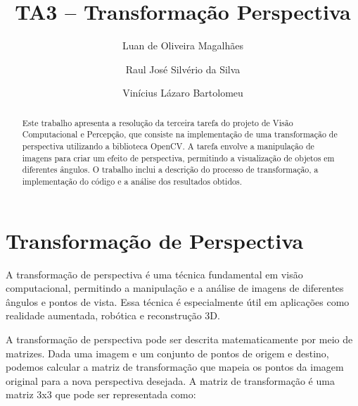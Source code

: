 \documentclass[sigconf,nonacm]{acmart}
\begin{document}
\title{TA3 – Transformação Perspectiva}

\author{Luan de Oliveira Magalhães}

\author{Raul José Silvério da Silva}

\author{Vinícius Lázaro Bartolomeu}

\begin{abstract}
    Este trabalho apresenta a resolução da terceira tarefa do projeto de Visão Computacional e Percepção, que consiste na implementação de uma transformação de perspectiva utilizando a biblioteca OpenCV. A tarefa envolve a manipulação de imagens para criar um efeito de perspectiva, permitindo a visualização de objetos em diferentes ângulos. O trabalho inclui a descrição do processo de transformação, a implementação do código e a análise dos resultados obtidos.
\end{abstract}


\maketitle


\section{Transformação de Perspectiva}
A transformação de perspectiva é uma técnica fundamental em visão computacional, permitindo a manipulação e a análise de imagens de diferentes ângulos e pontos de vista. Essa técnica é especialmente útil em aplicações como realidade aumentada, robótica e reconstrução 3D.

A transformação de perspectiva pode ser descrita matematicamente por meio de matrizes. Dada uma imagem e um conjunto de pontos de origem e destino, podemos calcular a matriz de transformação que mapeia os pontos da imagem original para a nova perspectiva desejada.
A matriz de transformação é uma matriz 3x3 que pode ser representada como:
\end{document}
